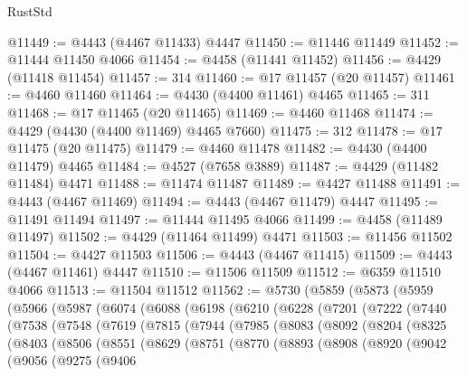 \begin{lexlean}{RustStd}
\begin{coremodule}
{\begin{coremodule}
{{{{{{{{{{{{{{{{{{{{{{{{{{{{{{{{{{{{{{{{{{{{{{{{{{{{{{{{{{{{{{{{{{{{@11449 := @4443 (@4467 @11433) @4447
@11450 := @11446 @11449
@11452 := @11444 @11450 @4066
@11454 := @4458 (@11441 @11452)
@11456 := @4429 (@11418 @11454)
@11457 := 314
@11460 := @17 @11457 (@20 @11457)
@11461 := @4460 @11460
@11464 := @4430 (@4400 @11461) @4465
@11465 := 311
@11468 := @17 @11465 (@20 @11465)
@11469 := @4460 @11468
@11474 := @4429 (@4430 (@4400 @11469) @4465 @7660)
@11475 := 312
@11478 := @17 @11475 (@20 @11475)
@11479 := @4460 @11478
@11482 := @4430 (@4400 @11479) @4465
@11484 := @4527 (@7658 @3889)
@11487 := @4429 (@11482 @11484) @4471
@11488 := @11474 @11487
@11489 := @4427 @11488
@11491 := @4443 (@4467 @11469)
@11494 := @4443 (@4467 @11479) @4447
@11495 := @11491 @11494
@11497 := @11444 @11495 @4066
@11499 := @4458 (@11489 @11497)
@11502 := @4429 (@11464 @11499) @4471
@11503 := @11456 @11502
@11504 := @4427 @11503
@11506 := @4443 (@4467 @11415)
@11509 := @4443 (@4467 @11461) @4447
@11510 := @11506 @11509
@11512 := @6359 @11510 @4066
@11513 := @11504 @11512
@11562 := @5730
    (@5859
      (@5873
        (@5959
          (@5966
            (@5987
              (@6074
                (@6088
                  (@6198
                    (@6210
                      (@6228
                        (@7201
                          (@7222
                            (@7440
                              (@7538
                                (@7548
                                  (@7619
                                    (@7815
                                      (@7944
                                        (@7985
                                          (@8083
                                            (@8092
                                              (@8204
                                                (@8325
                                                  (@8403
                                                    (@8506
                                                      (@8551
                                                        (@8629
                                                          (@8751
                                                            (@8770
                                                              (@8893
                                                                (@8908
                                                                  (@8920
                                                                    (@9042
                                                                      (@9056
                                                                        (@9275
                                                                          (@9406
}}}}}}}}}}}}}}}}}}}}}}}}}}}}}}}}}}}}}}}}}}}}}}}}}}}}}}}}}}}}}}}}}}}}
\end{coremodule}}
\end{coremodule}
\end{lexlean}

